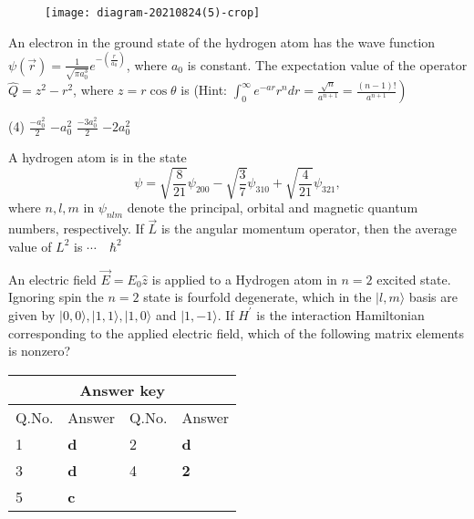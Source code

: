 \begin{enumerate}
\begin{tasks}
\begin{figure}[H]
	\end{figure}
	\task[\textbf{D.}]\begin{figure}[H]
		\centering
		\texttt{[image: diagram-20210824(5)-crop]}
	\end{figure}
\end{tasks}
\begin{minipage}{\textwidth}
	\item An electron in the ground state of the hydrogen atom has the wave function $\psi(\vec{r})=\frac{1}{\sqrt{\pi a_{0}^{3}}} e^{-\left(\frac{r}{a_{0}}\right)}$, where $a_{0}$ is constant. The expectation value of the operator $\hat{Q}=z^{2}-r^{2}$, where $z=r \cos \theta$ is
	(Hint: $\left.\int_{0}^{\infty} e^{-a r} r^{n} d r=\frac{\sqrt{n}}{a^{n+1}}=\frac{(n-1) !}{a^{n+1}}\right)$
\end{minipage}
\begin{tasks}(4)
	\task[\textbf{A.}] $\frac{-a_{0}^{2}}{2}$
	\task[\textbf{B.}]$-a_{0}^{2}$
	\task[\textbf{C.}]$\frac{-3 a_{0}^{2}}{2}$
	\task[\textbf{D.}]$-2 a_{0}^{2}$
\end{tasks}
\begin{minipage}{\textwidth}
	\item A hydrogen atom is in the state
	$$
	\psi=\sqrt{\frac{8}{21}} \psi_{200}-\sqrt{\frac{3}{7}} \psi_{310}+\sqrt{\frac{4}{21}} \psi_{321},
	$$
	where $n, l, m$ in $\psi_{n l m}$ denote the principal, orbital and magnetic quantum numbers, respectively. If $\vec{L}$ is the angular momentum operator, then the average value of $L^{2}$ is $\cdots \quad \hbar^{2}$
\end{minipage}
\begin{minipage}{\textwidth}
	\item An electric field $\vec{E}=E_{0} \hat{z}$ is applied to a Hydrogen atom in $n=2$ excited state. Ignoring spin the $n=2$ state is fourfold degenerate, which in the $|l, m\rangle$ basis are given by $|0,0\rangle,|1,1\rangle,|1,0\rangle$ and $|1,-1\rangle$. If $H^{\prime}$ is the interaction Hamiltonian corresponding to the applied electric field, which of the following matrix elements is nonzero?
\end{minipage}
\end{enumerate}


\setlength\arrayrulewidth{1pt}
\begin{table}[H]
	\centering
	
	\begin{tabular}{|p{1.5cm}|p{1.5cm}||p{1.5cm}|p{1.5cm}|}
		\hline
		\multicolumn{4}{|c|}{\textbf{Answer key}}\\\hline\hline
		\rowcolor{ocrel}Q.No.&Answer&Q.No.&Answer\\\hline
		1&\textbf{d}&2&\textbf{d}\\\hline
		3&\textbf{d}&4&\textbf{2}\\\hline
		5&\textbf{c}&&\\\hline
	\end{tabular}
\end{table}


